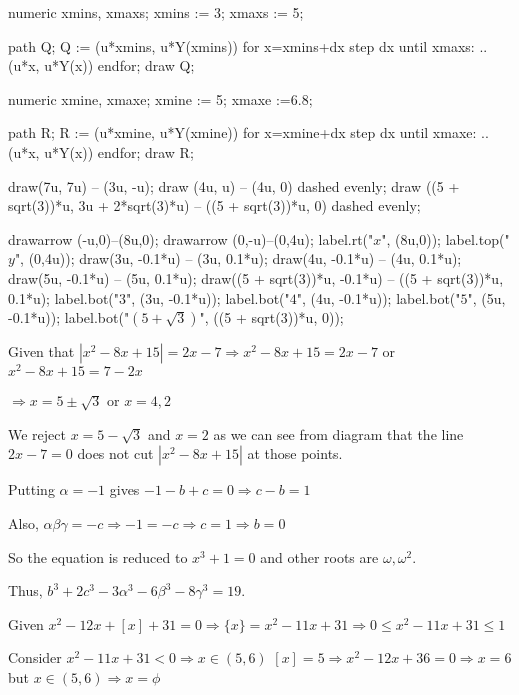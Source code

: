       numeric xmins, xmaxs;
      xmins := 3; xmaxs := 5;

      path Q;
      Q := (u*xmins, u*Y(xmins))
      for x=xmins+dx step dx until xmaxs:
      .. (u*x, u*Y(x))
      endfor;
      draw Q;

      numeric xmine, xmaxe;
      xmine := 5; xmaxe :=6.8;

      path R;
      R := (u*xmine, u*Y(xmine))
      for x=xmine+dx step dx until xmaxe:
      .. (u*x, u*Y(x))
      endfor;
      draw R;

      draw(7u, 7u) -- (3u, -u);
      draw (4u, u) -- (4u, 0) dashed evenly;
      draw ((5 + sqrt(3))*u, 3u + 2*sqrt(3)*u) -- ((5 + sqrt(3))*u, 0) dashed evenly;

      drawarrow (-u,0)--(8u,0);
      drawarrow (0,-u)--(0,4u);
      label.rt("$x$", (8u,0));
      label.top("$y$", (0,4u));
      draw(3u, -0.1*u) -- (3u, 0.1*u);
      draw(4u, -0.1*u) -- (4u, 0.1*u);
      draw(5u, -0.1*u) -- (5u, 0.1*u);
      draw((5 + sqrt(3))*u, -0.1*u) -- ((5 + sqrt(3))*u, 0.1*u);
      label.bot("$3$", (3u, -0.1*u));
      label.bot("$4$", (4u, -0.1*u));
      label.bot("$5$", (5u, -0.1*u));
      label.bot("$(5 + \sqrt{3})$", ((5 + sqrt(3))*u, 0));
    \stopMPcode
  \stopplacefigure

  Given that $|x^2 - 8x + 15| = 2x - 7\Rightarrow x^2 - 8x + 15 = 2x - 7$ or $x^2 - 8x + 15 = 7 - 2x$

  $\Rightarrow x = 5 \pm\sqrt{3}$ or $x = 4, 2$

  We reject $x = 5 - \sqrt{3}$ and $x = 2$ as we can see from diagram that the line $2x - 7 = 0$ does not
  cut $|x^2 - 8x + 15|$ at those points.
\item Putting $\alpha = -1$ gives $-1 - b + c = 0 \Rightarrow c - b = 1$

  Also, $\alpha\beta\gamma = -c \Rightarrow -1 = -c \Rightarrow c = 1\Rightarrow b = 0$

  So the equation is reduced to $x^3 + 1 = 0$ and other roots are $\omega, \omega^2$.

  Thus, $b^3 + 2c^3 - 3\alpha^3- 6\beta^3 -8\gamma^3 = 19$.
\item Given $x^2 - 12x +[x] + 31 = 0\Rightarrow \{x\} = x^2 - 11x + 31\Rightarrow 0\leq x^2 - 11x + 31\leq
  1$

  Consider $x^2 - 11x + 31 < 0\Rightarrow x\in(5, 6)$ $[x] = 5\Rightarrow x^2 - 12x + 36 = 0 \Rightarrow x =
  6$ but $x\in(5, 6)\Rightarrow x = \phi$

